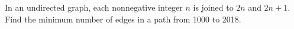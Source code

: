 In an undirected graph, each nonnegative integer $ n $ is joined to $ 2n $ and $ 2n+1 $. Find the minimum number of edges in a path from 1000 to 2018.
